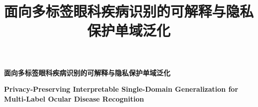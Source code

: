 \documentclass[a4paper,12pt]{article}
\title{面向多标签眼科疾病识别的可解释与隐私保护单域泛化}
\author{}
\date{}
\begin{document}
\begin{center}
{\bfseries 面向多标签眼科疾病识别的可解释与隐私保护单域泛化\par}

{\bfseries Privacy-Preserving Interpretable Single-Domain Generalization for Multi-Label Ocular Disease Recognition\par}
\end{center}
\vspace{-0.2em}
\thispagestyle{empty}






\FloatBarrier


\end{document}
